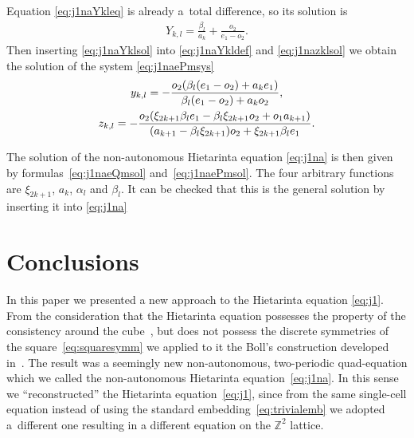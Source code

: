 \documentclass[pdftex]{sigma}
\numberwithin{equation}{section}
\newcommand{\Z}{\mathbb{Z}}
\begin{document}
 Equation \eqref{eq:j1naYkleq} is already a~total dif\/ference, so its solution is
 \begin{gather}
 Y_{{k,l}}={\frac {\beta_{{l}}}{a_{{k}}}} +{\frac {{ o_2}}{{ e_1}-{ o_2}}} . \label{eq:j1naYklsol}
 \end{gather}
 Then inserting \eqref{eq:j1naYklsol} into \eqref{eq:j1naYkldef} and \eqref{eq:j1nazklsol} we obtain the solution of the system \eqref{eq:j1naePmsys}
 \begin{subequations} \label{eq:j1naePmsol}
 \begin{gather}
 y_{{k,l}}= -{\frac {{ o_2} ( \beta_{{l}} ( { e_1}-{ o_2} )
 +a_{{k}}{ e_1} ) }{ \beta_{{l}} ( { e_1}-{ o_2} )
 +a_{{k}}{ o_2}}}, \label{eq:j1nayklsol} \\
 z_{{k,l}}=-{\frac {{ o_2} ( \xi_{{2 k+1}}\beta_{{l}}{ e_1}
 -\beta_{{l}}\xi_{{2 k+1}}{ o_2}+{ o_1} a_{{k+1}} ) }{%
 ( a_{{k+1}}-\beta_{{l}}\xi_{{2 k+1}} ) { o_2}
 +\xi_{{2 k+1}}\beta_{{l}}{ e_1}}}. \label{eq:j1nazklsol2}
 \end{gather}
 \end{subequations}

The solution of the non-autonomous Hietarinta equation \eqref{eq:j1na} is then given by formulas~\eqref{eq:j1naeQmsol} and~\eqref{eq:j1naePmsol}. The four arbitrary functions are $\xi_{2k+1}$, $a_{k}$, $\alpha_{l}$ and $\beta_{l}$. It can be checked that this is the general solution by inserting it into \eqref{eq:j1na}

\section{Conclusions}\label{sec:conclusions}

In this paper we presented a new approach to the Hietarinta equation \eqref{eq:j1}. From the consi\-de\-ration that the Hietarinta equation possesses the property of the consistency around the cube~\cite{Hietarinta2005}, but does not possess the discrete symmetries of the square~\eqref{eq:squaresymm} we applied to it the Boll's construction developed in~\cite{ABS2009,Boll2011,Boll2012a,Boll2012b,HietarintaViallet2012,Xenitidis2009}. The result was a seemingly new non-autonomous, two-periodic quad-equation which we called the non-autonomous Hietarinta equation~\eqref{eq:j1na}. In this sense we ``reconstructed'' the Hietarinta equation~\eqref{eq:j1}, since from the same single-cell equation instead of using the standard embedding~\eqref{eq:trivialemb} we adopted a~dif\/ferent one resulting in a dif\/ferent equation on the $\Z^{2}$ lattice.
\end{document}
